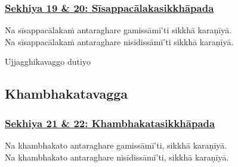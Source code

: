 \subsubsection*{\hyperref[training19-20]{Sekhiya 19 \& 20: Sīsappacālakasikkhāpada}}
\label{sekh19-20}

Na sīsappacālakaṁ antaraghare gamissāmī'ti sikkhā karaṇīyā.\\
Na sīsappacālakaṁ antaraghare nisīdissāmī'ti sikkhā karaṇīyā.

\begin{center}
	Ujjagghikavaggo\makeatletter\hyperlink{endnote476-appendix}\makeatother{} dutiyo\makeatletter\hyperlink{endnote477-appendix}\makeatother{}
\end{center}



\subsection{Khambhakatavagga}
\label{sekh-vagga3}

\subsubsection*{\hyperref[training21-22]{Sekhiya 21 \& 22: Khambhakatasikkhāpada}}
\label{sekh21-22}

Na khambhakato\makeatletter\hyperlink{endnote478-appendix}\makeatother{} antaraghare gamissāmī'ti, sikkhā karaṇīyā.\\
Na khambhakato antaraghare nisīdissāmī'ti, sikkhā karaṇīyā.



